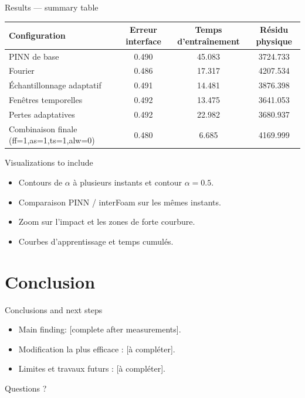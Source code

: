 \documentclass[aspectratio=169,11pt]{beamer}
\begin{document}
\begin{frame}{Results — summary table}
\centering
\begin{tabular}{lccc}
\toprule
Configuration & Erreur interface & Temps d'entraînement & Résidu physique \\
\midrule
PINN de base & 0.490 & 45.083 & 3724.733 \\
Fourier & 0.486 & 17.317 & 4207.534 \\
Échantillonnage adaptatif & 0.491 & 14.481 & 3876.398 \\
Fenêtres temporelles & 0.492 & 13.475 & 3641.053 \\
Pertes adaptatives & 0.492 & 22.982 & 3680.937 \\
Combinaison finale (ff=1,as=1,ts=1,alw=0) & 0.480 & 6.685 & 4169.999 \\
\bottomrule
\end{tabular}
\end{frame}

\begin{frame}{Visualizations to include}
\begin{itemize}
  \item Contours de $\alpha$ à plusieurs instants et contour $\alpha=0.5$.
  \item Comparaison PINN / interFoam sur les mêmes instants.
  \item Zoom sur l'impact et les zones de forte courbure.
  \item Courbes d'apprentissage et temps cumulés.
\end{itemize}
\end{frame}

\section{Conclusion}
\begin{frame}{Conclusions and next steps}
\begin{itemize}
  \item Main finding: [complete after measurements].
  \item Modification la plus efficace : [à compléter].
  \item Limites et travaux futurs : [à compléter].
\end{itemize}
\vfill
\centering \Large Questions ?
\end{frame}
\end{document}
